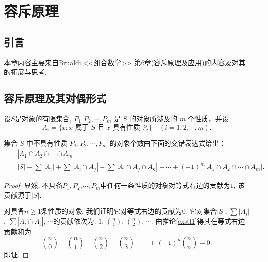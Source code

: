 \chapter{容斥原理}
\section*{引言}
本章内容主要来自Brualdi <<组合数学>> 第6章(容斥原理及应用)的内容及对其的拓展与思考.

\section{容斥原理及其对偶形式}
设$S$是对象的有限集合, $P_1, P_2, \cdots, P_m$ 是 $S$ 的对象所涉及的 $m$ 个性质，并设
\[ A_i = \{ x : x \text{ 属于 } S \text{ 且 } x \text{ 具有性质 } P_i \} \quad (i = 1, 2, \cdots, m). \]

\begin{theorem}[容斥原理的对偶形式]
    集合 $S$ 中不具有性质 $P_1, P_2, \cdots, P_m$ 的对象个数由下面的交错表达式给出：
    \begin{align*}
          & |\overline{A}_1 \cap \overline{A}_2 \cap \cdots \cap \overline{A}_m|                                                         \\
        = & |S| - \sum |A_i| + \sum |A_i \cap A_j| - \sum |A_i \cap A_j \cap A_k| + \cdots + (-1)^m |A_1 \cap A_2 \cap \cdots \cap A_m|.
    \end{align*}
\end{theorem}

\begin{proof}
    显然, 不具备$P_1, P_2, \cdots, P_m$中任何一条性质的对象对等式右边的贡献为$1$, 该贡献源于$|S|$.

    对具备$n\geq 1$条性质的对象, 我们证明它对等式右边的贡献为$0$. 它对集合$|S|$, $\sum |A_i|$, $\sum |A_i \cap A_j|$, $\cdots$的贡献依次为: $1$, $\binom{n}{1}$, $\binom{n}{2}$, $\cdots$. 由推论\ref{exstl1}得其在等式右边贡献和为
    $$\binom{n}{0} - \binom{n}{1} + \binom{n}{2} - \binom{n}{3} + \cdots + (-1)^n \binom{n}{n}=0.$$
    即证.
\end{proof}

